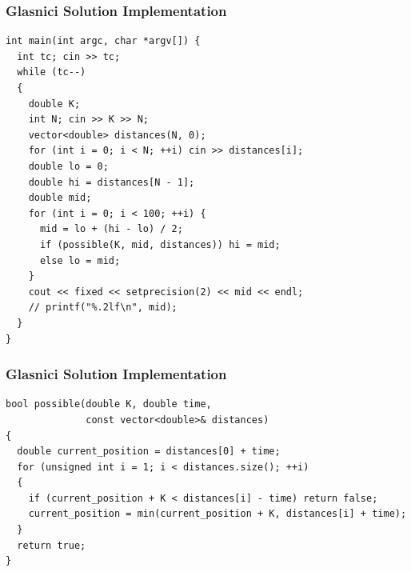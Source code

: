 \documentclass{beamer}
\begin{document}
\begin{frame}
\begin{itemize}
\begin{itemize}
\end{itemize}

\end{itemize}

\end{frame}


\begin{frame}[containsverbatim]
\frametitle{Glasnici Solution Implementation}
\scriptsize

\begin{lstlisting}[mathescape]
int main(int argc, char *argv[]) {
  int tc; cin >> tc;
  while (tc--)
  {
    double K;
    int N; cin >> K >> N;
    vector<double> distances(N, 0);
    for (int i = 0; i < N; ++i) cin >> distances[i];
    double lo = 0;
    double hi = distances[N - 1];
    double mid;
    for (int i = 0; i < 100; ++i) {
      mid = lo + (hi - lo) / 2;
      if (possible(K, mid, distances)) hi = mid;
      else lo = mid;
    }
    cout << fixed << setprecision(2) << mid << endl;
    // printf("%.2lf\n", mid);
  }
}
\end{lstlisting}

\end{frame}

\begin{frame}[containsverbatim]
\frametitle{Glasnici Solution Implementation}
\scriptsize

\begin{lstlisting}[mathescape]
bool possible(double K, double time,
              const vector<double>& distances)
{
  double current_position = distances[0] + time;
  for (unsigned int i = 1; i < distances.size(); ++i)
  {
    if (current_position + K < distances[i] - time) return false;
    current_position = min(current_position + K, distances[i] + time);
  }
  return true;
}
\end{lstlisting}

\end{frame}
\end{document}
